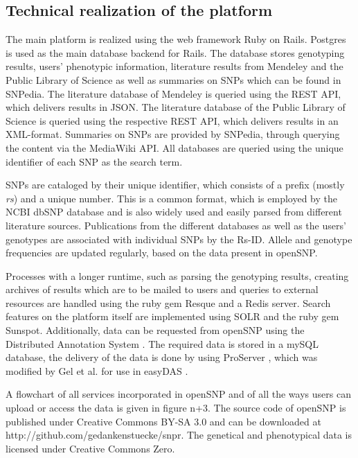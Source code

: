\documentclass[10pt]{article}
\begin{document}
\subsection*{Technical realization of the platform}
The main platform is realized using the web framework Ruby on Rails. Postgres is used as the main database backend for Rails. The database stores genotyping results, users' phenotypic information, literature results from Mendeley and the Public Library of Science as well as summaries on SNPs which can be found in SNPedia. The literature database of Mendeley is queried using the REST API, which delivers results in JSON. The literature database of the Public Library of Science is queried using the respective REST API, which delivers results in an XML-format. Summaries on SNPs are provided by SNPedia, through querying the content via the MediaWiki API. All databases are queried using the unique identifier of each SNP as the search term. 

SNPs are cataloged by their unique identifier, which consists of a prefix (mostly \textit{rs}) and a unique number. This is a common format, which is employed by the NCBI dbSNP database and is also widely used and easily parsed from different literature sources. Publications from the different databases as well as the users' genotypes are associated with individual SNPs by the Rs-ID. Allele and genotype frequencies are updated regularly, based on the data present in openSNP. 

Processes with a longer runtime, such as parsing the genotyping results, creating archives of results which are to be mailed to users and queries to external resources are handled using the ruby gem Resque and a Redis server. Search features on the platform itself are implemented using SOLR and the ruby gem Sunspot. Additionally, data can be requested from openSNP using the Distributed Annotation System \cite{Dowell2001,Jenkinson2008}. The required data is stored in a mySQL database, the delivery of the data is done by using ProServer \cite{Finn2007}, which was modified by Gel et al. for use in easyDAS \cite{GelMoreno2011}.  

A flowchart of all services incorporated in openSNP and of all the ways users can upload or access the data is given in figure n+3. The source code of openSNP is published under Creative Commons BY-SA 3.0 and can be downloaded at http://github.com/gedankenstuecke/snpr. The genetical and phenotypical data is licensed under Creative Commons Zero. 
\end{document}

